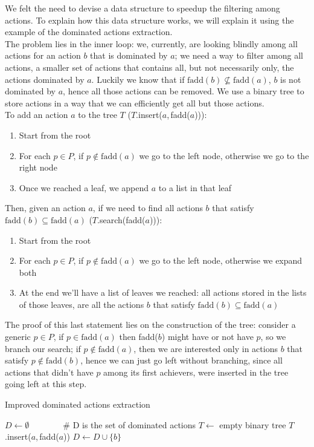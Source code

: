 We felt the need to devise a data structure to speedup the filtering among actions. To explain how this data structure works, we will explain it using the example of the dominated actions extraction.\\
The problem lies in the inner loop: we, currently, are looking blindly among all actions for an action $b$ that is dominated by $a$; we need a way to filter among all actions, a smaller set of actions that contains all, but not necessarily only, the actions dominated by $a$. Luckily we know that if $\mbox{fadd}(b)\not\subseteq\mbox{fadd}(a)$, $b$ is not dominated by $a$, hence all those actions can be removed. We use a binary tree to store actions in a way that we can efficiently get all but those actions.\\
To add an action $a$ to the tree $T$ ($T.$insert($a$,\,\mbox{fadd}($a$))):
\begin{enumerate}
    \item Start from the root
    \item For each $p\in P$, if $p\not\in \mbox{fadd}(a)$ we go to the left node, otherwise we go to the right node
    \item Once we reached a leaf, we append $a$ to a list in that leaf
\end{enumerate}
Then, given an action $a$, if we need to find all actions $b$ that satisfy $\mbox{fadd}(b)\subseteq\mbox{fadd}(a)$ ($T$.search(\mbox{fadd}($a$))):
\begin{enumerate}
    \item Start from the root
    \item For each $p\in P$, if $p\not\in \mbox{fadd}(a)$ we go to the left node, otherwise we expand both
    \item At the end we'll have a list of leaves we reached: all actions stored in the lists of those leaves, are all the actions $b$ that satisfy $\mbox{fadd}(b)\subseteq\mbox{fadd}(a)$
\end{enumerate}
The proof of this last statement lies on the construction of the tree: consider a generic $p\in P$, if $p\in\mbox{fadd}(a)$ then fadd($b$) might have or not have $p$, so we branch our search; if $p\not\in\mbox{fadd}(a)$, then we are interested only in actions $b$ that satisfy $p\not\in\mbox{fadd}(b)$, hence we can just go left without branching, since all actions that didn't have $p$ among its first achievers, were inserted in the tree going left at this step.
\begin{algorithm}[h]
    \caption{Improved dominated actions extraction}
    \begin{algorithmic}
        \State $D\gets\emptyset\qquad\qquad$\# D is the set of dominated actions
        \State $T\gets$ empty binary tree
            \State $T$.insert($a$,\,\mbox{fadd}($a$))
        \EndFor
                    \State $D\gets D\cup\{b\}$
                \EndIf
            \EndFor
        \EndFor
    \end{algorithmic}
\end{algorithm}

